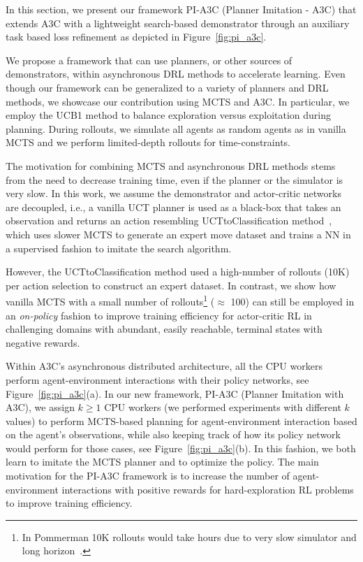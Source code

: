 \documentclass[letterpaper]{article} %
\begin{document}
In this section, we present our framework PI-A3C (Planner Imitation - A3C) that extends A3C with a lightweight search-based demonstrator through an auxiliary task based loss refinement as depicted in Figure~\ref{fig:pi_a3c}. %



We propose a framework that can use planners, or other sources of demonstrators, within asynchronous DRL methods to accelerate learning.
Even though our framework can be generalized to a variety of planners and DRL methods, we showcase our contribution using MCTS and A3C. In particular, we employ the UCB1 method to balance exploration versus exploitation during planning. During rollouts, we simulate all agents as random agents as in vanilla MCTS and we perform limited-depth rollouts for time-constraints.

The motivation for combining MCTS and asynchronous DRL methods stems from the need to decrease training time, even if the planner or the simulator is very slow. In this work, we assume the demonstrator and actor-critic networks are decoupled, i.e., a vanilla UCT planner is used as a black-box that takes an observation and returns an action resembling UCTtoClassification method~\cite{guo2014deep}, which uses slower MCTS to generate an expert move dataset and trains a NN in a supervised fashion to imitate the search algorithm.

However, the UCTtoClassification method used a high-number of rollouts (10K) per action selection to construct an expert dataset. In contrast, we show how vanilla MCTS with a small number of rollouts\footnote{In Pommerman 10K rollouts would take hours due to very slow simulator and long horizon~\cite{matiisen2018pommerman}.} ($\approx$ 100) can still be employed in an \textit{on-policy} fashion to improve training efficiency for actor-critic RL in challenging domains with abundant, easily reachable, terminal states with negative rewards.

Within A3C's asynchronous distributed architecture, all the CPU workers perform agent-environment interactions with their policy networks, see Figure~\ref{fig:pi_a3c}(a). In our new framework, PI-A3C (Planner Imitation with A3C), we assign $k\ge 1$ CPU
workers (we performed experiments with different $k$ values) to perform MCTS-based planning for agent-environment interaction based on the agent's observations, while also keeping track of how its policy network would perform for those cases, see Figure~\ref{fig:pi_a3c}(b). In this fashion, we both learn to imitate the MCTS planner and to optimize the policy. The main motivation for the PI-A3C framework is to increase the number of agent-environment interactions with positive rewards for hard-exploration RL problems to improve training efficiency.
\end{document}
